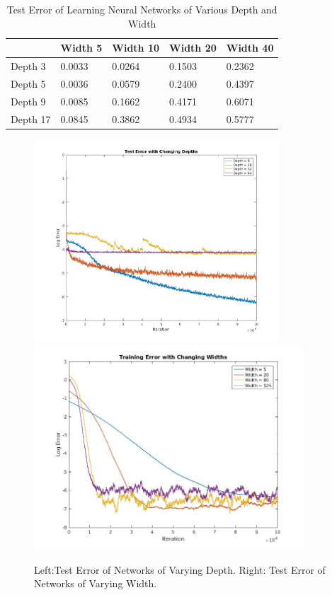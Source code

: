 \documentclass[11pt]{article}
\begin{document}
\begin{table}[ht]

\centering
\begin{tabular}{
  |p{}|%
  |p{}%
  |p{}%
  |p{}%
   |p{}|%
  }
   \hline 
           & Width 5   &  Width 10   & Width 20 & Width 40     \\ \hline 
    Depth 3 & 0.0033   & 0.0264        &   0.1503 & 0.2362 \\ \hline
    Depth 5 & 0.0036   & 0.0579        &   0.2400 & 0.4397 \\ \hline
    Depth 9 & 0.0085   & 0.1662        &   0.4171 & 0.6071 \\ \hline
    Depth 17 & 0.0845   & 0.3862        &   0.4934 & 0.5777 \\ \hline
\end{tabular}
\caption{Test Error of Learning Neural Networks of Various Depth and Width}
\end{table}

\begin{figure}[ht]
\includegraphics[height = 3in]{plotChangeDepth.jpg}\includegraphics[height = 3in]{plotChangeWidth.jpg}
\caption{Left:Test Error of Networks of Varying Depth. Right: Test Error of Networks of Varying Width.}
\end{figure}
\end{document}
